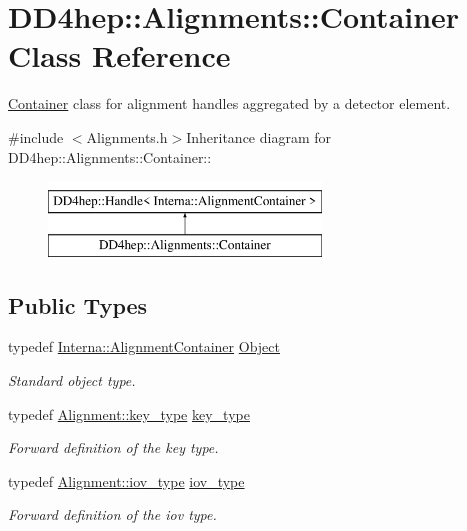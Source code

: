 \hypertarget{class_d_d4hep_1_1_alignments_1_1_container}{
\section{DD4hep::Alignments::Container Class Reference}
\label{class_d_d4hep_1_1_alignments_1_1_container}
}


\hyperlink{class_d_d4hep_1_1_alignments_1_1_container}{Container} class for alignment handles aggregated by a detector element.  


{\ttfamily \#include $<$Alignments.h$>$}Inheritance diagram for DD4hep::Alignments::Container::\begin{figure}[H]
\begin{center}
\leavevmode
\includegraphics[height=2cm]{class_d_d4hep_1_1_alignments_1_1_container}
\end{center}
\end{figure}
\subsection*{Public Types}
\begin{DoxyCompactItemize}
\item 
typedef \hyperlink{class_d_d4hep_1_1_alignments_1_1_interna_1_1_alignment_container}{Interna::AlignmentContainer} \hyperlink{class_d_d4hep_1_1_alignments_1_1_container_aac463478e91949b594ffe837fd9bd9a8}{Object}
\begin{DoxyCompactList}\small\item\em Standard object type. \item\end{DoxyCompactList}\item 
typedef \hyperlink{class_d_d4hep_1_1_alignments_1_1_alignment_ab824a65f935a0c79b9ea1a7a85014b88}{Alignment::key\_\-type} \hyperlink{class_d_d4hep_1_1_alignments_1_1_container_a4101ffa946cedbaf996682533e57c44e}{key\_\-type}
\begin{DoxyCompactList}\small\item\em Forward definition of the key type. \item\end{DoxyCompactList}\item 
typedef \hyperlink{class_d_d4hep_1_1_i_o_v}{Alignment::iov\_\-type} \hyperlink{class_d_d4hep_1_1_alignments_1_1_container_a0da2fec1e4433deea86defda82886128}{iov\_\-type}
\begin{DoxyCompactList}\small\item\em Forward definition of the iov type. \item\end{DoxyCompactList}\end{DoxyCompactItemize}

